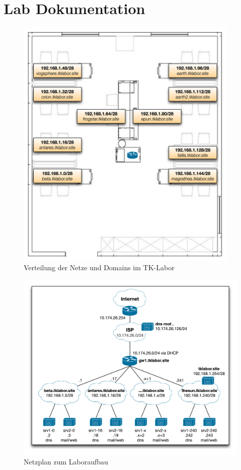\section{Lab Dokumentation}
\begin{figure}[ht]
 	\centering
 		\includegraphics[width=0.95\textwidth]{images/lab-aufbau.png}
 		\caption{Verteilung der Netze und Domains im TK-Labor}
 	\label{fig:chap-labdocu-aufbau}
\end{figure}

\begin{figure}[ht]
 	\centering
 		\includegraphics[width=1.0\textwidth]{images/lab-netzplan.png}
 		\caption{Netzplan zum Laboraufbau}
 	\label{fig:chap-labdocu-netzplan}
\end{figure}
